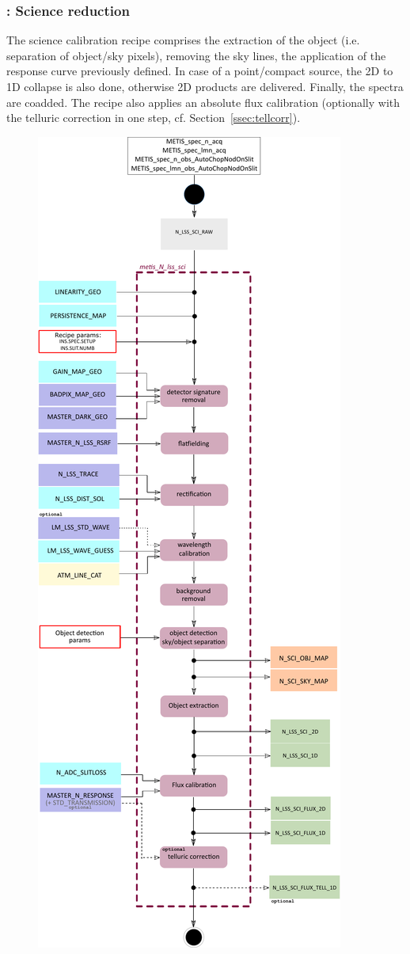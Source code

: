 \subsubsection{:  Science reduction}\label{rec:metis_n_lss_sci}
The science calibration recipe comprises the extraction of the object (i.e. separation of object/sky pixels), removing the sky lines, the application of the response curve previously defined. In case of a point/compact source, the 2D to 1D collapse is also done, otherwise 2D products are delivered. Finally, the spectra are coadded. The recipe also applies an absolute flux calibration (optionally with the telluric correction in one step, cf. Section~\ref{ssec:tellcorr}).
\begin{figure}[ht]
  \centering
  \includegraphics[width=0.35\textheight]{figures/metis_N_lss_sci_v0.83.pdf}

\end{figure}

